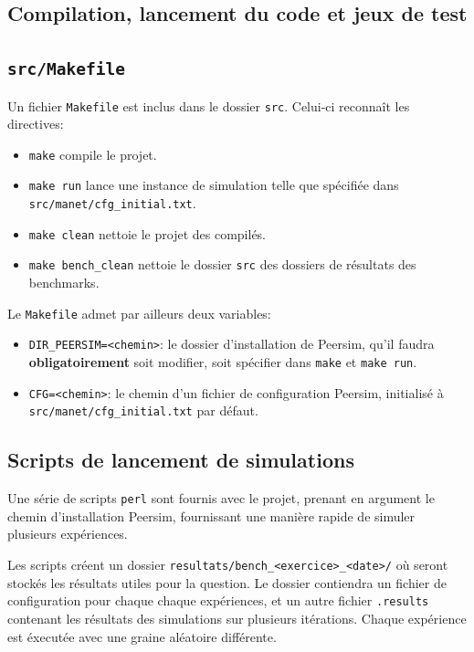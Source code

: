 \documentclass[a4paper]{article}
\begin{document}
\pagebreak


\begin{appendix}
  \section{Compilation, lancement du code et jeux de test}
  \subsection{\texttt{src/Makefile}}
    Un fichier \texttt{Makefile} est inclus dans le dossier
    \texttt{src}. Celui-ci reconnaît les directives:
    \begin{itemize}
    \item \texttt{make} compile le projet.
    \item \texttt{make run} lance une instance de simulation telle que
      spécifiée dans \texttt{src/manet/cfg\_initial.txt}.
    \item \texttt{make clean} nettoie le projet des compilés.
    \item \texttt{make bench\_clean} nettoie le dossier \texttt{src}
      des dossiers de résultats des benchmarks.\\
    \end{itemize}

    Le \texttt{Makefile} admet par ailleurs deux variables:
    \begin{itemize}
    \item \texttt{DIR\_PEERSIM=<chemin>}: le dossier d'installation de
      Peersim, qu'il faudra \textbf{obligatoirement} soit modifier,
      soit spécifier dans \texttt{make} et \texttt{make run}.
    \item \texttt{CFG=<chemin>}: le chemin d'un fichier de
      configuration Peersim, initialisé à \texttt{src/manet/cfg\_initial.txt} par défaut.
    \end{itemize}

    \subsection{Scripts de lancement de simulations}
    Une série de scripts \texttt{perl} sont fournis avec le projet,
    prenant en argument le chemin d'installation Peersim, fournissant
    une manière rapide de simuler plusieurs expériences.

    Les scripts créent un dossier \texttt{resultats/bench\_<exercice>\_<date>/} où seront stockés les
    résultats utiles pour la question. Le dossier contiendra
    un fichier de configuration pour chaque chaque expériences, et un
    autre fichier \texttt{.results} contenant les résultats des
    simulations sur plusieurs itérations. Chaque expérience est éxecutée avec une graine aléatoire différente.



\end{appendix}
\end{document}
